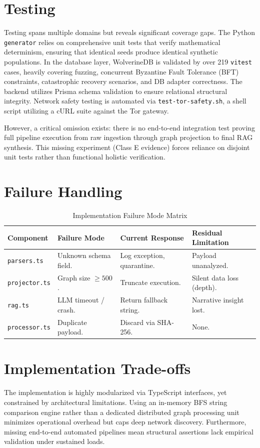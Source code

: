 \section{Testing}
\label{sec:impl-testing}
Testing spans multiple domains but reveals significant coverage gaps. The Python \texttt{generator} relies on comprehensive unit tests that verify mathematical determinism, ensuring that identical seeds produce identical synthetic populations. In the database layer, WolverineDB is validated by over 219 \texttt{vitest} cases, heavily covering fuzzing, concurrent Byzantine Fault Tolerance (BFT) constraints, catastrophic recovery scenarios, and DB adapter correctness. The backend utilizes Prisma schema validation to ensure relational structural integrity. Network safety testing is automated via \texttt{test-tor-safety.sh}, a shell script utilizing a cURL suite against the Tor gateway. 

However, a critical omission exists: there is no end-to-end integration test proving full pipeline execution from raw ingestion through graph projection to final RAG synthesis. This missing experiment (Class E evidence) forces reliance on disjoint unit tests rather than functional holistic verification.

\section{Failure Handling}
\label{sec:impl-failure-handling}
\begin{table}[h]
\centering
\begin{tabular}{p{} p{} p{} p{}}
\toprule
\textbf{Component} & \textbf{Failure Mode} & \textbf{Current Response} & \textbf{Residual Limitation} \\
\midrule
\texttt{parsers.ts} & Unknown schema field. & Log exception, quarantine. & Payload unanalyzed. \\
\texttt{projector.ts} & Graph size $\ge 500$. & Truncate execution. & Silent data loss (depth). \\
\texttt{rag.ts} & LLM timeout / crash. & Return fallback string. & Narrative insight lost. \\
\texttt{processor.ts} & Duplicate payload. & Discard via SHA-256. & None. \\
\bottomrule
\end{tabular}
\caption{Implementation Failure Mode Matrix}
\label{tab:failure-matrix}
\end{table}

\section{Implementation Trade-offs}
\label{sec:impl-tradeoffs}
The implementation is highly modularized via TypeScript interfaces, yet constrained by architectural limitations. Using an in-memory BFS string comparison engine rather than a dedicated distributed graph processing unit minimizes operational overhead but caps deep network discovery. Furthermore, missing end-to-end automated pipelines mean structural assertions lack empirical validation under sustained loads.
